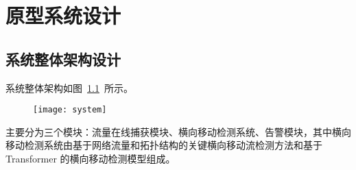 \chapter{原型系统设计}{
{
\let\cleardoublepage\relax
}

\section{系统整体架构设计}

系统整体架构如图~\ref{fig:system}~所示。

\begin{figure}[!htbp]
    \centering
    \texttt{[image: system]}
    \label{fig:system}

\end{figure}

主要分为三个模块：流量在线捕获模块、横向移动检测系统、告警模块，其中横向移动检测系统由基于网络流量和拓扑结构的关键横向移动流检测方法和基于 Transformer 的横向移动检测模型组成。

}